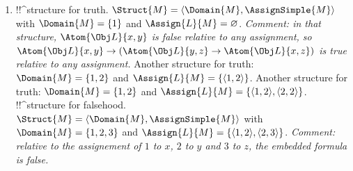 \documentclass[../../../../include/open-logic-section]{subfiles}
\begin{document}
\begin{prob}
\begin{ans}
\begin{enumerate}
	with $\Domain{M}=\{1,2\}$ and $\Assign{L}{M}=\{\langle 1,2 \rangle, 
	\langle 2,2 \rangle \}$. \emph{Comment: in that structure the antecedent 
	is true, since $\lexists x \Atom{\Obj L}{x,y}$ is true relative to any assignment of an object to $x$, and the consequent is true, since $\forall x \Atom{\Obj L}{x,y}$ is true relative to the assignment of $2$ to $x$.}\\
	!!^{structure} for falsehood. $\Struct{M}=\langle\Domain{M},\AssignSimple{M}\rangle$
	with $\Domain{M}=\{1,2\}$ and $\Assign{L}{M}=\{\langle 1,1 \rangle, 
	\langle 2,2 \rangle\}$. Another structure for falsehood: $\Domain{M}=\{1,2\}$ and $\Assign{L}{M}=\{\langle 1,2 \rangle, 
	\langle 2,1 \rangle\}$.
	\item !!^{structure} for truth. $\Struct{M}=\langle\Domain{M},\AssignSimple{M}\rangle$ with $\Domain{M}=\{1\}$ and $\Assign{L}{M}=\varnothing$. 
	\emph{Comment: in that structure, $\Atom{\Obj L}{x,y}$ is false relative to any assignment, so $\Atom{\Obj L}{x,y} \rightarrow (\Atom{\Obj L}{y,z} \rightarrow \Atom{\Obj L}{x,z})$ is true relative to any assignment.} Another structure for truth: $\Domain{M}=\{1,2\}$ and $\Assign{L}{M}=\{\langle 1,2 \rangle \}$. Another 
	structure for truth: $\Domain{M}=\{1,2\}$ and $\Assign{L}{M}=\{\langle 1,2 \rangle, \langle 2,2 \rangle \}$.\\
	!!^{structure} for falsehood. $\Struct{M}=\langle\Domain{M},\AssignSimple{M}\rangle$ with $\Domain{M}=\{1,2,3\}$ and $\Assign{L}{M}=\{\langle 1,2 \rangle, \langle 2,3 \rangle \}$. \emph{Comment: relative to the assignement of $1$ to
	$x$, $2$ to $y$ and $3$ to $z$, the embedded formula is false.}
\end{enumerate}
\end{ans}
\end{prob}
\end{document}
